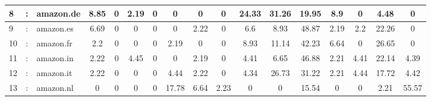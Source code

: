 \documentclass[crop]{standalone}
\begin{document}
\begin{tabular}{|lcl|c|c|c|c|c|c|c|c|c|c|c|c|c|c|}
8 & : & amazon.de & \cellcolor{red!8.85}8.85 & 0 & \cellcolor{red!2.19}2.19 & 0 & 0 & 0 & 0 & \cellcolor{red!24.33}24.33 & \cellcolor{green!31.259999999999998}31.26 & \cellcolor{red!19.95}19.95 & \cellcolor{red!8.9}8.9 & 0 & \cellcolor{red!4.48}4.48 & 0 \\ \hline
9 & : & amazon.es & \cellcolor{red!6.690000000000001}6.69 & 0 & 0 & 0 & 0 & \cellcolor{red!2.2200000000000006}2.22 & 0 & \cellcolor{red!6.6000000000000005}6.6 & \cellcolor{red!8.93}8.93 & \cellcolor{green!48.870000000000005}48.87 & \cellcolor{red!2.1900000000000004}2.19 & \cellcolor{red!2.2000000000000006}2.2 & \cellcolor{red!22.260000000000005}22.26 & 0 \\ \hline
10 & : & amazon.fr & \cellcolor{red!2.2000000000000006}2.2 & 0 & 0 & 0 & \cellcolor{red!2.1900000000000004}2.19 & 0 & 0 & \cellcolor{red!8.93}8.93 & \cellcolor{red!11.140000000000002}11.14 & \cellcolor{red!42.230000000000004}42.23 & \cellcolor{green!6.64}6.64 & 0 & \cellcolor{red!26.650000000000002}26.65 & 0 \\ \hline
11 & : & amazon.in & \cellcolor{red!2.2200000000000006}2.22 & 0 & \cellcolor{red!4.45}4.45 & 0 & 0 & \cellcolor{red!2.1900000000000004}2.19 & 0 & \cellcolor{red!4.410000000000001}4.41 & \cellcolor{red!6.650000000000002}6.65 & \cellcolor{red!46.88000000000001}46.88 & \cellcolor{red!2.21}2.21 & \cellcolor{green!4.410000000000001}4.41 & \cellcolor{red!22.140000000000004}22.14 & \cellcolor{red!4.390000000000001}4.39 \\ \hline
12 & : & amazon.it & \cellcolor{red!2.22}2.22 & 0 & 0 & 0 & \cellcolor{red!4.44}4.44 & \cellcolor{red!2.22}2.22 & 0 & \cellcolor{red!4.34}4.34 & \cellcolor{red!26.729999999999997}26.73 & \cellcolor{red!31.22}31.22 & \cellcolor{red!2.21}2.21 & \cellcolor{red!4.44}4.44 & \cellcolor{green!17.72}17.72 & \cellcolor{red!4.42}4.42 \\ \hline
13 & : & amazon.nl & 0 & 0 & 0 & 0 & \cellcolor{red!17.78}17.78 & \cellcolor{red!6.64}6.64 & \cellcolor{red!2.23}2.23 & 0 & 0 & \cellcolor{red!15.54}15.54 & 0 & 0 & \cellcolor{red!2.21}2.21 & \cellcolor{green!55.57}55.57 \\ \hline
\end{tabular}
\end{document}
